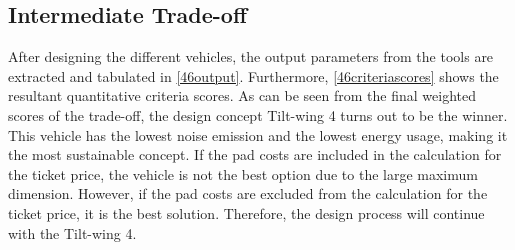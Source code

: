 \subsection{Intermediate Trade-off}
\label{InterTO-46}
After designing the different vehicles, the output parameters from the tools are extracted and tabulated in \autoref{46output}. Furthermore, \autoref{46criteriascores} shows the resultant quantitative criteria scores. As can be seen from the final weighted scores of the trade-off, the design concept Tilt-wing 4 turns out to be the winner. This vehicle has the lowest noise emission and the lowest energy usage, making it the most sustainable concept. If the pad costs are included in the calculation for the ticket price, the vehicle is not the best option due to the large maximum dimension. However, if the pad costs are excluded from the calculation for the ticket price, it is the best solution. Therefore, the design process will continue with the Tilt-wing 4.


